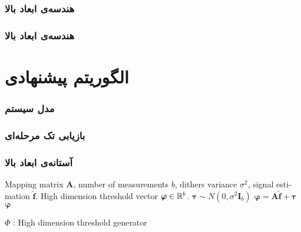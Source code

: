 \begin{frame}
\frametitle{هندسه‌ی ابعاد بالا}
\framesubtitle{}

\end{frame}

\begin{frame}
\frametitle{هندسه‌ی ابعاد بالا}
\framesubtitle{}
\end{frame}


\section{الگوریتم پیشنهادی\hfill}

\begin{frame}
\frametitle{مدل سیستم}

\begin{figure}
	\centering
	
\end{figure}

\end{frame}

\begin{frame}
\frametitle{بازیابی تک مرحله‌ای}

\end{frame}

\begin{frame}
\frametitle{آستانه‌ی ابعاد بالا}
\begin{latin}
\begin{algorithm}[H]
\begin{algorithmic}[1]
\renewcommand{\algorithmicrequire}{\textbf{Input:}}
\renewcommand{\algorithmicensure}{\textbf{Output:}}
\REQUIRE Mapping matrix $ \bm{A} $, number of measurements $ b $, dithers variance $ \sigma^{2} $, signal estimation $ \hat{\bm{f}} $.
\ENSURE High dimension threshold vector $\bm{\varphi}\in \mathbb{R}^{b}$.
\STATE $ \bm{\tau}\sim N(0,\sigma^{2}\bm{I}_{b} ) $
\STATE  $ \bm{\varphi}=\bm{A}\hat{\bm{f}}+\bm{\tau} $
\RETURN $ \bm{\varphi} $
\end{algorithmic} 
\caption{ $\Phi$ : High dimension threshold generator}
\label{alg:HDTG}
\end{algorithm}
\end{latin}
\end{frame}

